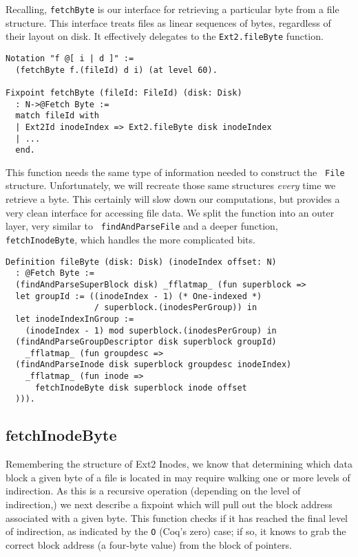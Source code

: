 \documentclass[nocopyrightspace]{sigplanconf}
\begin{document}
Recalling, {\tt fetchByte} is our interface for retrieving a particular byte
from a file structure. This interface treats files as linear sequences of
bytes, regardless of their layout on disk. It effectively delegates to the
{\tt Ext2.fileByte} function.

\begin{lstlisting}
Notation "f @[ i | d ]" := 
  (fetchByte f.(fileId) d i) (at level 60).

Fixpoint fetchByte (fileId: FileId) (disk: Disk)
  : N->@Fetch Byte := 
  match fileId with
  | Ext2Id inodeIndex => Ext2.fileByte disk inodeIndex
  | ...
  end.
\end{lstlisting}

This function needs the same type of information needed to construct the {\tt
File} structure. Unfortunately, we will recreate those same structures {\em
every} time we retrieve a byte. This certainly will slow down our
computations, but provides a very clean interface for accessing file data. We
split the function into an outer layer, very similar to {\tt
findAndParseFile} and a deeper function, {\tt fetchInodeByte}, which handles
the more complicated bits.

\begin{lstlisting}
Definition fileByte (disk: Disk) (inodeIndex offset: N)
  : @Fetch Byte :=
  (findAndParseSuperBlock disk) _fflatmap_ (fun superblock =>
  let groupId := ((inodeIndex - 1) (* One-indexed *)
                  / superblock.(inodesPerGroup)) in
  let inodeIndexInGroup :=
    (inodeIndex - 1) mod superblock.(inodesPerGroup) in
  (findAndParseGroupDescriptor disk superblock groupId) 
    _fflatmap_ (fun groupdesc =>
  (findAndParseInode disk superblock groupdesc inodeIndex)
    _fflatmap_ (fun inode =>
      fetchInodeByte disk superblock inode offset
  ))).
\end{lstlisting}

\subsection{fetchInodeByte}

Remembering the structure of Ext2 Inodes, we know that determining which data
block a given byte of a file is located in may require walking one or more
levels of indirection. As this is a recursive operation (depending on the
level of indirection,) we next describe a fixpoint which will pull out the
block address associated with a given byte. This function checks if it has
reached the final level of indirection, as indicated by the {\tt O} (Coq's
zero) case; if so, it knows to grab the correct block address (a four-byte
value) from the block of pointers.
\end{document}
